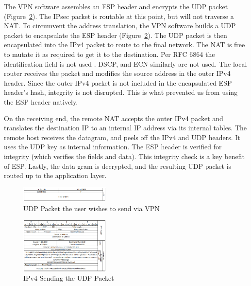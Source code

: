 \documentclass[conference,12pt]{IEEEtran}
\begin{document}
The VPN software assembles an ESP header and encrypts the UDP packet (Figure~\ref{fig:outer_ip}).  The IPsec
packet is routable at this point, but will not traverse a NAT.  To circumvent
the address translation, the VPN software builds a UDP packet to encapsulate the
ESP header (Figure~\ref{fig:outer_ip}).  The UDP packet is then encapsulated into the
IPv4 packet to route to the final network. The NAT is free to mutate it as required to get it to the
destination. Per RFC 6864 the identification field is not used
\autocite{rfc6864}. DSCP, and ECN
similarly are not used. The local router receives the packet and modifies the source address
 in the outer IPv4 header. Since the outer IPv4 packet is not included in the
 encapsulated ESP header's hash, integrity is not disrupted. This is what
 prevented us from using the ESP
header natively. 

On the receiving end, the remote NAT accepts the outer IPv4 packet and
translates the destination IP to an internal IP address via its internal
tables.  The remote host receives the datagram, and peels off the IPv4 and
UDP headers. It uses the UDP key as internal information.  The ESP header is
verified for integrity (which verifies the fields and data).  This integrity
check is a key benefit of ESP. Lastly, the data gram is
decrypted, and the resulting UDP packet is routed up to the application layer.


\begin{figure}
\centering
\includegraphics[width=0.4\textwidth]{udp_1.png}
\caption{UDP Packet the user wishes to send via VPN}
\label{fig:udp}
\end{figure}

\begin{figure}
\centering
\includegraphics[width=0.4\textwidth]{ip4_4.png}
\caption{IPv4 Sending the UDP Packet}
\label{fig:outer_ip}
\end{figure}
\end{document}
